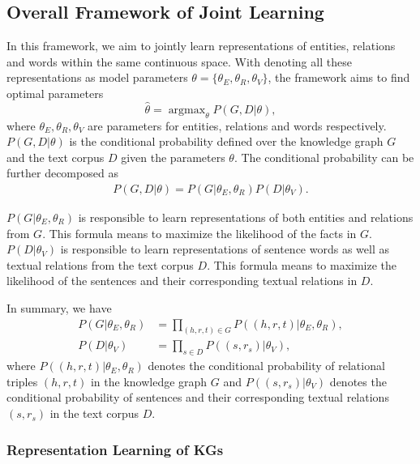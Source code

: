 \documentclass[letterpaper]{article} %
\begin{document}
\subsection{Overall Framework of Joint Learning}
\label{sec:joint}


In this framework, we aim to jointly learn representations of entities, relations and words within the same continuous space. With denoting all these representations as model parameters $\theta = \{\theta_E, \theta_R, \theta_V\}$, the framework aims to find optimal parameters
\begin{equation}
\hat{\theta} = \mathop{\arg\max}_{\theta} P(G, D | {\theta}),
\end{equation}
where $\theta_E, \theta_R, \theta_V$ are parameters for entities, relations and words respectively. $P(G, D | {\theta})$ is the conditional probability defined over the knowledge graph $G$ and the text corpus $D$ given the parameters $\theta$. The conditional probability can be further decomposed as
\begin{align}
\label{eq:topeq}
P(G,D|{\theta}) = P(G|{\theta_E,\theta_R})P(D|{\theta_V}).
\end{align}

$P(G|\theta_E, \theta_R)$ is responsible to learn representations of both entities and relations from $G$. This formula means to maximize the likelihood of the facts in $G$. $P(D|{\theta_V})$ is responsible to learn representations of sentence words as well as textual relations from the text corpus $D$. This formula means to maximize the likelihood of the sentences and their corresponding textual relations in $D$. 

In summary, we have
\begin{align}
 P(G|{\theta_E,\theta_R}) & = \prod_{(h,r,t) \in G}P((h, r, t)|{\theta_E, \theta_R}), \\
 P(D|{\theta_V}) & = \prod_{s \in D}P((s, r_s)|{\theta_V}),
\end{align}
where $P((h, r, t)|{\theta_E,\theta_R})$ denotes the conditional probability of relational triples $(h, r, t)$ in the knowledge graph $G$ and $P((s, r_s)|{\theta_V})$ denotes the conditional probability of sentences and their corresponding textual relations $(s, r_s)$ in the text corpus $D$.


\subsubsection{Representation Learning of KGs}
\label{sec:kg}
\end{document}
